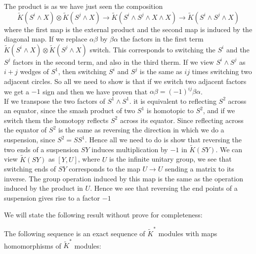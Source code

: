 \documentclass[../Thesis.tex]{subfiles}
\begin{document}
\begin{myproof}
The product is as we have just seen the composition
\begin{equation}
\tilde{K}(S^i \wedge X) \otimes \tilde{K}(S^j \wedge X) \rightarrow \tilde{K}(S^i\wedge S^j \wedge X \wedge X) \rightarrow \tilde{K}(S^i \wedge S^j \wedge X)
\end{equation}
where the first map is the external product and the second map is induced by the diagonal map. If we replace $\alpha \beta$ by $\beta \alpha$ the factors in the first term $\tilde{K}(S^i \wedge X) \otimes \tilde{K}(S^j \wedge X)$ switch. This corresponds to switching the $S^i$ and the $S^j$ factors in the second term, and also in the third therm. If we view $S^i \wedge S^j$ as $i+j$ wedges of $S^1$, then switching $S^i$ and $S^j$  is the same as $ij$ times switching two adjacent circles. So all we need to show is that if we switch two adjacent factors we get a $-1$ sign and then we have proven that $\alpha\beta = (-1)^{ij} \beta \alpha$.
\\If we transpose the two factors of $S^1 \wedge S^1$. it is equivalent to reflecting $S^2$ across an equator, since the smash product of two $S^1$ is homotopic to $S^2$, and if we switch them the homotopy reflects $S^2$ across its equator. Since reflecting across the equator of $S^2$ is the same as reversing the direction in which we do a suspension, since $S^2 = SS^1$. Hence all we need to do is show that reversing the two ends of a suspension $SY$ induces multiplication by $-1$ in $\tilde{K}(SY)$.
We can view $\tilde{K}(SY)$ as $[Y,U]$, where $U$ is the infinite unitary group, we see that switching ends of $SY$ corresponds to the map $U \rightarrow U$ sending a matrix to its inverse. The group operation induced by this map is the same as the operation induced by the product in $U$. Hence we see that reversing the end points of a suspension gives rise to a factor $-1$
\end{myproof}
We will state the following result without prove for completeness:
\begin{prop}
The following sequence is an exact sequence of $\tilde{K}^*$ modules with maps homomorphisms of $\tilde{K}^*$ modules:
\begin{center}
\end{center}
\end{prop}
\end{document}
